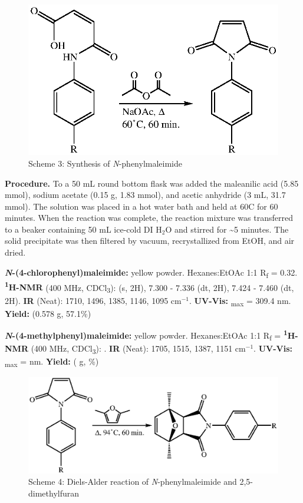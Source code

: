 \documentclass[11pt]{article}
\let\bf\textbf
\begin{document}
\begin{figure}[H]
    \centering
    \includegraphics[scale=0.8]{schemes/scheme2.eps}
    \caption*{Scheme 3: Synthesis of \textit{N}-phenylmaleimide}
\end{figure}

\bf{Procedure.} To a 50 mL round bottom flask was added the maleanilic acid (5.85 mmol), sodium acetate (0.15 g, 1.83 mmol), and acetic anhydride (3 mL, 31.7 mmol). The solution was placed in a hot water bath and held at 60\degree C for 60 minutes. When the reaction was complete, the reaction mixture was transferred to a beaker containing 50 mL ice-cold DI H$_2$O and stirred for \textasciitilde 5 minutes. The solid precipitate was then filtered by vacuum, recrystallized from EtOH, and air dried.

\bf{\textit{N}-(4-chlorophenyl)maleimide:} yellow powder. Hexanes:EtOAc 1:1 R\textsubscript{f} = 0.32. \bf{\textsuperscript{1}H-NMR} (400 MHz, CDCl\textsubscript{3}): \textdelta{} (s, 2H), 7.300 - 7.336 (dt, 2H), 7.424 - 7.460 (dt, 2H). \bf{IR} (Neat): 1710, 1496, 1385, 1146, 1095 cm$^{-1}$. \bf{UV-Vis:} \textlambda\textsubscript{max} = 309.4 nm. \bf{Yield:} (0.578 g, 57.1\%)

\bf{\textit{N}-(4-methylphenyl)maleimide:} yellow powder. Hexanes:EtOAc 1:1 R\textsubscript{f} = \bf{\textsuperscript{1}H-NMR} (400 MHz, CDCl\textsubscript{3}): \textdelta\; . \bf{IR} (Neat): 1705, 1515, 1387, 1151 cm$^{-1}$. \bf{UV-Vis:} \textlambda\textsubscript{max} = nm. \bf{Yield:} ( g, \%)

\begin{figure}[H]
    \centering
    \includegraphics[scale=0.8]{schemes/scheme3.eps}
    \caption*{Scheme 4: Diels-Alder reaction of \textit{N}-phenylmaleimide and 2,5-dimethylfuran}
\end{figure}
\end{document}
